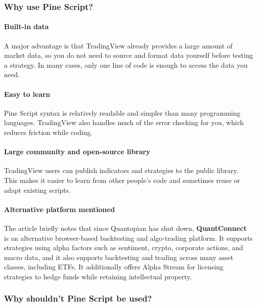 \documentclass[12pt,openany]{book}
\begin{document}
\subsubsection{Why use Pine Script?}

\paragraph{Built-in data}

A major advantage is that TradingView already provides a large amount of market data, so you do not need to source and format data yourself before testing a strategy. In many cases, only one line of code is enough to access the data you need.

\paragraph{Easy to learn}

Pine Script syntax is relatively readable and simpler than many programming languages. TradingView also handles much of the error checking for you, which reduces friction while coding.

\paragraph{Large community and open-source library}

TradingView users can publish indicators and strategies to the public library. This makes it easier to learn from other people's code and sometimes reuse or adapt existing scripts.

\paragraph{Alternative platform mentioned}

The article briefly notes that since Quantopian has shut down, \textbf{QuantConnect} is an alternative browser-based backtesting and algo-trading platform. It supports strategies using alpha factors such as sentiment, crypto, corporate actions, and macro data, and it also supports backtesting and trading across many asset classes, including ETFs. It additionally offers Alpha Stream for licensing strategies to hedge funds while retaining intellectual property.

\subsubsection{Why shouldn't Pine Script be used?}
\end{document}
